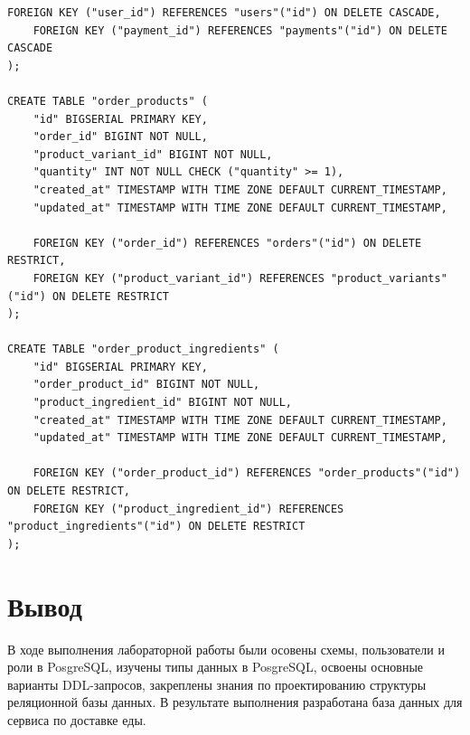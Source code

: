 \documentclass[a4paper,14pt]{extarticle}
\begin{document}
\begin{Verbatim}[tabsize=4,fontsize=\small]
    FOREIGN KEY ("user_id") REFERENCES "users"("id") ON DELETE CASCADE,
    FOREIGN KEY ("payment_id") REFERENCES "payments"("id") ON DELETE CASCADE
);

CREATE TABLE "order_products" (
    "id" BIGSERIAL PRIMARY KEY,
    "order_id" BIGINT NOT NULL,
    "product_variant_id" BIGINT NOT NULL,
    "quantity" INT NOT NULL CHECK ("quantity" >= 1),
    "created_at" TIMESTAMP WITH TIME ZONE DEFAULT CURRENT_TIMESTAMP,
    "updated_at" TIMESTAMP WITH TIME ZONE DEFAULT CURRENT_TIMESTAMP,

    FOREIGN KEY ("order_id") REFERENCES "orders"("id") ON DELETE RESTRICT,
    FOREIGN KEY ("product_variant_id") REFERENCES "product_variants"("id") ON DELETE RESTRICT
);

CREATE TABLE "order_product_ingredients" (
    "id" BIGSERIAL PRIMARY KEY,
    "order_product_id" BIGINT NOT NULL,
    "product_ingredient_id" BIGINT NOT NULL,
    "created_at" TIMESTAMP WITH TIME ZONE DEFAULT CURRENT_TIMESTAMP,
    "updated_at" TIMESTAMP WITH TIME ZONE DEFAULT CURRENT_TIMESTAMP,

    FOREIGN KEY ("order_product_id") REFERENCES "order_products"("id") ON DELETE RESTRICT,
    FOREIGN KEY ("product_ingredient_id") REFERENCES "product_ingredients"("id") ON DELETE RESTRICT
);
  \end{Verbatim}

  \section*{Вывод}
  В ходе выполнения лабораторной работы были осовены схемы, пользователи и роли в PosgreSQL, изучены типы данных в PosgreSQL, освоены основные варианты DDL-запросов, закреплены знания по проектированию структуры реляционной базы данных. В результате выполнения разработана база данных для сервиса по доставке еды.
\end{document}

